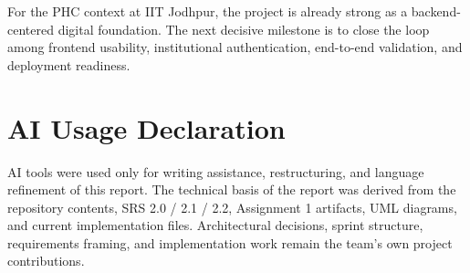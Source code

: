 \documentclass[conference]{IEEEtran}
\begin{document}
For the PHC context at IIT Jodhpur, the project is already strong as a backend-centered digital foundation. The next decisive milestone is to close the loop among frontend usability, institutional authentication, end-to-end validation, and deployment readiness.

\section{AI Usage Declaration}
AI tools were used only for writing assistance, restructuring, and language refinement of this report. The technical basis of the report was derived from the repository contents, SRS 2.0 / 2.1 / 2.2, Assignment 1 artifacts, UML diagrams, and current implementation files. Architectural decisions, sprint structure, requirements framing, and implementation work remain the team's own project contributions.
\end{document}
